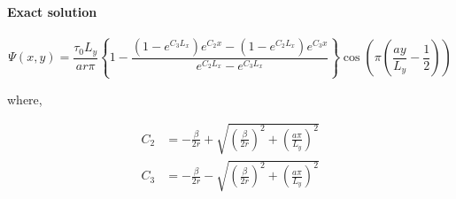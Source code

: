 \documentclass[11pt]{article}
\begin{document}
    \begin{center}
    \end{center}
    { \hspace*{\fill} \\}
    
    \hypertarget{exact-solution}{%
\paragraph{Exact solution}\label{exact-solution}}

\[
\Psi(x,y)=\frac{\tau_0 L_y}{ar\pi} \left\{ 1- \frac{(1-e^{C_3 L_x}) e^{C_2 x} - (1-e^{C_2 L_x}) e^{C_3 x} }{e^{C_2 L_x} - e^{C_3 L_x}} \right\} \cos{\left( \pi\left( \frac{ay}{L_y} - \frac{1}{2} \right) \right)}
\]

where,

\begin{align}
C_2 &= -\frac{\beta}{2r} + \sqrt{\left( \frac{\beta}{2r} \right)^2 + \left( \frac{a \pi}{L_y} \right)^2}\\
C_3 &= -\frac{\beta}{2r} - \sqrt{\left( \frac{\beta}{2r} \right)^2 + \left( \frac{a \pi}{L_y} \right)^2
}
\end{align}
\end{document}
